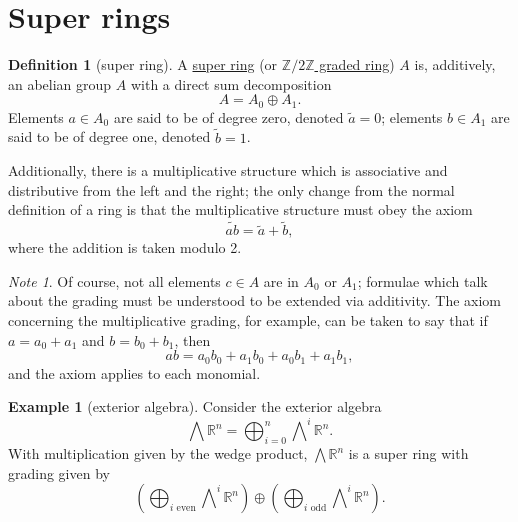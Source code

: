 \documentclass[a4paper,10pt]{scrreprt}
\newcommand{\R}{\mathbb{R}}
\newcommand{\Z}{\mathbb{Z}}
\newcommand{\defn}[1]{\ul{#1}}
\theoremstyle{definition}
\newtheorem{definition}{Definition}[section]
\newtheorem{example}{Example}[section]
\theoremstyle{plain}
\theoremstyle{remark}
\newtheorem{note}{Note}[section]
\begin{document}
\section{Super rings}
\begin{definition}[super ring]
  \label{def:superring}
  A \defn{super ring} (or \defn{$\Z/2\Z$ graded ring}) $A$ is, additively, an abelian group $A$ with a direct sum decomposition
  \begin{equation*}
    A = A_{0} \oplus A_{1}.
  \end{equation*}
  Elements $a\in A_{0}$ are said to be of degree zero, denoted $\tilde{a} = 0$; elements $b\in A_{1}$ are said to be of degree one, denoted $\tilde{b} = 1$.

  Additionally, there is a multiplicative structure which is associative and distributive from the left and the right; the only change from the normal definition of a ring is that the multiplicative structure must obey the axiom
  \begin{equation*}
    \widetilde{ab} = \tilde{a} + \tilde{b},
  \end{equation*}
  where the addition is taken modulo 2.
\end{definition}

\begin{note}
  Of course, not all elements $c \in A$ are in $A_{0}$ or $A_{1}$; formulae which talk about the grading must be understood to be extended via additivity. The axiom concerning the multiplicative grading, for example, can be taken to say that if $a = a_{0} + a_{1}$ and $b = b_{0} + b_{1}$, then
  \begin{equation*}
    ab = a_{0} b_{0} + a_{1} b_{0} + a_{0} b_{1} + a_{1} b_{1},
  \end{equation*}
  and the axiom applies to each monomial.
\end{note}

\begin{example}[exterior algebra]
  \label{eg:exterioralgebra}
  Consider the exterior algebra
  \begin{equation*}
    \bigwedge \R^{n} = \bigoplus_{i=0}^{n} \bigwedge\nolimits^{i} \R^{n}.
  \end{equation*}
  With multiplication given by the wedge product, $\bigwedge \R^{n}$ is a super ring with grading given by
  \begin{equation*}
    \left( \bigoplus_{i\text{ even}} \bigwedge\nolimits^{i}\R^{n} \right) \oplus \left( \bigoplus_{i\text{ odd}}\bigwedge\nolimits^{i}\R^{n} \right).
  \end{equation*}
\end{example}
\end{document}

